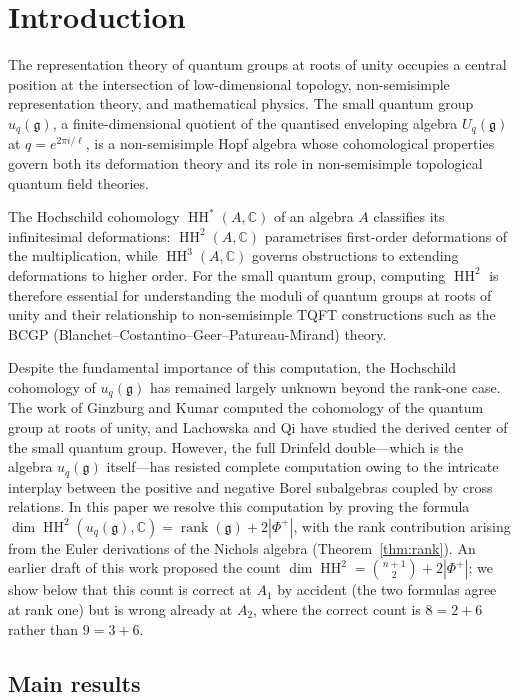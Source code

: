 \documentclass[11pt,letterpaper]{amsart}
\theoremstyle{plain}
\theoremstyle{definition}
\theoremstyle{remark}
\newcommand{\HH}{\operatorname{HH}}
\newcommand{\CC}{\mathbb{C}}
\begin{document}
\section{Introduction}
\label{sec:intro}
The representation theory of quantum groups\cite{Dr87} at roots of unity occupies a central position at the intersection of low-dimensional topology, non-semisimple representation theory, and mathematical physics. The small quantum group $u_q(\mathfrak{g})$, a finite-dimensional quotient of the quantised enveloping algebra $U_q(\mathfrak{g})$ at $q = e^{2\pi i/\ell}$, is a non-semisimple Hopf algebra whose cohomological properties govern both its deformation theory and its role in non-semisimple topological quantum field theories.

The Hochschild cohomology $\HH^*(A, \CC)$ of an algebra $A$ classifies its infinitesimal deformations: $\HH^2(A, \CC)$ parametrises first-order deformations of the multiplication, while $\HH^3(A, \CC)$ governs obstructions to extending deformations to higher order. For the small quantum group, computing $\HH^2$ is therefore essential for understanding the moduli of quantum groups at roots of unity and their relationship to non-semisimple TQFT constructions such as the BCGP (Blanchet--Costantino--Geer--Patureau-Mirand) theory.

Despite the fundamental importance of this computation, the Hochschild cohomology of $u_q(\mathfrak{g})$ has remained largely unknown beyond the rank-one case. The work of Ginzburg and Kumar\cite{GK93} computed the cohomology of the quantum group at roots of unity, and Lachowska and Qi\cite{LQ21} have studied the derived center of the small quantum group. However, the full Drinfeld double---which is the algebra $u_q(\mathfrak{g})$ itself---has resisted complete computation owing to the intricate interplay between the positive and negative Borel subalgebras coupled by cross relations. In this paper we resolve this computation by proving the formula $\dim \HH^2(u_q(\mathfrak{g}), \CC) = \operatorname{rank}(\mathfrak{g}) + 2|\Phi^+|$, with the rank contribution arising from the Euler derivations of the Nichols algebra (Theorem~\ref{thm:rank}). An earlier draft of this work proposed the count $\dim \HH^2 = \binom{n+1}{2} + 2|\Phi^+|$; we show below that this count is correct at $A_1$ by accident (the two formulas agree at rank one) but is wrong already at $A_2$, where the correct count is $8 = 2 + 6$ rather than $9 = 3 + 6$.

\subsection{Main results}
\end{document}
